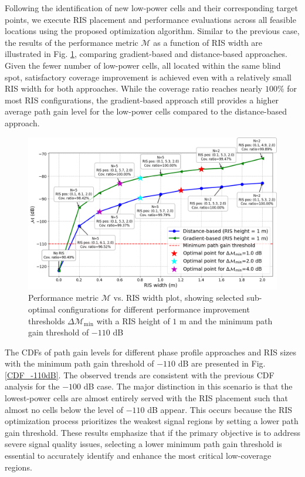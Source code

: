 \documentclass{IEEEoj}
\begin{document}
Following the identification of new low-power cells and their corresponding target points, we execute RIS placement and performance evaluations across all feasible locations using the proposed optimization algorithm. Similar to the previous case, the results of the performance metric $\mathcal{M}$ as a function of RIS width are illustrated in Fig. \ref{perf_metric_RIS_width_-110dB_multiple_curves_height_1m}, comparing gradient-based and distance-based approaches. Given the fewer number of low-power cells, all located within the same blind spot, satisfactory coverage improvement is achieved even with a relatively small RIS width for both approaches. While the coverage ratio reaches nearly $100\%$ for most RIS configurations, the gradient-based approach still provides a higher average path gain level for the low-power cells compared to the distance-based approach.

\begin{figure}
	\centering \includegraphics[width=\linewidth]{Sim_Results/perf_metric_RIS_width_-110dB_multiple_curves_height_1m.png}
	\caption{Performance metric $\mathcal{M}$ vs. RIS width plot, showing selected sub-optimal configurations for different performance improvement thresholds $\Delta \mathcal{M}_{\text{min}}$ with a RIS height of $1$ m and the minimum path gain threshold of $-110$ dB}
	\label{perf_metric_RIS_width_-110dB_multiple_curves_height_1m}
\end{figure}

The CDFs of path gain levels for different phase profile approaches and RIS sizes with the minimum path gain threshold of $-110$ dB are presented in Fig. \ref{CDF_-110dB}. The observed trends are consistent with the previous CDF analysis for the $-100$ dB case. The major distinction in this scenario is that the lowest-power cells are almost entirely served with the RIS placement such that almost no cells below the level of $-110$ dB appear. This occurs because the RIS optimization process prioritizes the weakest signal regions by setting a lower path gain threshold. These results emphasize that if the primary objective is to address severe signal quality issues, selecting a lower minimum path gain threshold is essential to accurately identify and enhance the most critical low-coverage regions.
\end{document}
